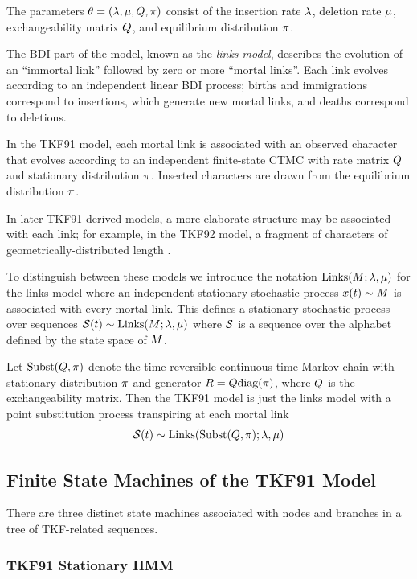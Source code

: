 The parameters $\theta = (\lambda, \mu, Q, \pi)$ consist of the insertion rate $\lambda$, deletion rate $\mu$, exchangeability matrix $Q$, and equilibrium distribution $\pi$.

The BDI part of the model, known as the {\em links model}, describes the evolution of an ``immortal link'' followed by zero or more ``mortal links''.
Each link evolves according to an independent linear BDI process; births and immigrations correspond to insertions, which generate new mortal links, and deaths correspond to deletions.

In the TKF91 model, each mortal link is associated with an observed character that evolves according to an independent finite-state CTMC with rate matrix $Q$ and stationary distribution $\pi$.
Inserted characters are drawn from the equilibrium distribution $\pi$.

In later TKF91-derived models, a more elaborate structure may be associated with each link; for example, in the TKF92 model, a fragment of characters of geometrically-distributed length \cite{ThorneEtAl92}.

To distinguish between these models
we introduce the notation ${\mbox{Links}}(M;\lambda,\mu)$ for the links model where an independent stationary stochastic process $x(t) \sim M$ is associated with every mortal link.
This defines a stationary stochastic process over sequences $\mathcal{S}(t) \sim {\mbox{Links}}(M;\lambda,\mu)$ where $\mathcal{S}$ is a sequence over the alphabet defined by the state space of $M$.

Let ${\mbox{Subst}}(Q,\pi)$ denote the time-reversible continuous-time Markov chain with stationary distribution $\pi$ and generator $R = Q {\mbox{diag}}(\pi)$, where $Q$ is the exchangeability matrix.
Then the TKF91 model is just the links model with a point substitution process transpiring at each mortal link
\[
\mathcal{S}(t) \sim {\mbox{Links}}({\mbox{Subst}}(Q,\pi);\lambda,\mu)
\]

\subsection{Finite State Machines of the TKF91 Model}
\label{sec:tkf91-machines}

There are three distinct state machines associated with nodes and branches in a tree of TKF-related sequences.

\subsubsection{TKF91 Stationary HMM}

